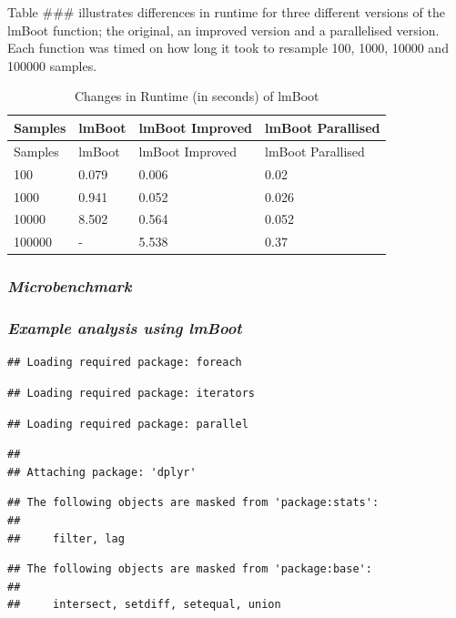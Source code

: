 \documentclass[]{article}
\begin{document}
Table \#\#\# illustrates differences in runtime for three different
versions of the lmBoot function; the original, an improved version and a
parallelised version. Each function was timed on how long it took to
resample 100, 1000, 10000 and 100000 samples.

\begin{longtable}[]{@{}llll@{}}
\caption{Changes in Runtime (in seconds) of lmBoot}\tabularnewline
\toprule
Samples & lmBoot & lmBoot Improved & lmBoot Parallised\tabularnewline
\midrule
\endfirsthead
\toprule
Samples & lmBoot & lmBoot Improved & lmBoot Parallised\tabularnewline
\midrule
\endhead
100 & 0.079 & 0.006 & 0.02\tabularnewline
1000 & 0.941 & 0.052 & 0.026\tabularnewline
10000 & 8.502 & 0.564 & 0.052\tabularnewline
100000 & - & 5.538 & 0.37\tabularnewline
\bottomrule
\end{longtable}

\subsubsection{\texorpdfstring{\emph{Microbenchmark}}{Microbenchmark}}\label{microbenchmark}

\subsubsection{\texorpdfstring{\emph{Example analysis using
lmBoot}}{Example analysis using lmBoot}}\label{example-analysis-using-lmboot}

\begin{verbatim}
## Loading required package: foreach
\end{verbatim}

\begin{verbatim}
## Loading required package: iterators
\end{verbatim}

\begin{verbatim}
## Loading required package: parallel
\end{verbatim}

\begin{verbatim}
## 
## Attaching package: 'dplyr'
\end{verbatim}

\begin{verbatim}
## The following objects are masked from 'package:stats':
## 
##     filter, lag
\end{verbatim}

\begin{verbatim}
## The following objects are masked from 'package:base':
## 
##     intersect, setdiff, setequal, union
\end{verbatim}
\end{document}

